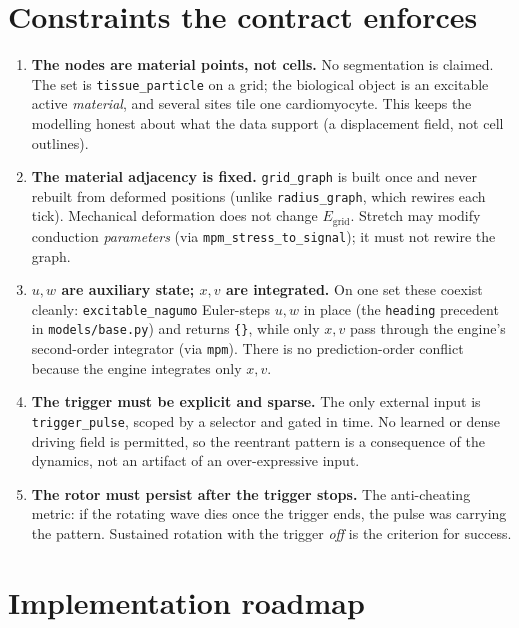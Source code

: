 \documentclass[11pt]{article}
\newcommand{\code}[1]{\texttt{#1}}
\begin{document}
\section{Constraints the contract enforces}

\begin{enumerate}\itemsep4pt
\item \textbf{The nodes are material points, not cells.} No segmentation is claimed.
The set is \code{tissue\_particle} on a grid; the biological object is an excitable
active \emph{material}, and several sites tile one cardiomyocyte. This keeps the
modelling honest about what the data support (a displacement field, not cell
outlines).

\item \textbf{The material adjacency is fixed.} \code{grid\_graph} is built once and
never rebuilt from deformed positions (unlike \code{radius\_graph}, which rewires
each tick). Mechanical deformation does not change $E_{\mathrm{grid}}$. Stretch may
modify conduction \emph{parameters} (via \code{mpm\_stress\_to\_signal}); it must not
rewire the graph.

\item \textbf{$u,w$ are auxiliary state; $x,v$ are integrated.} On one set these
coexist cleanly: \code{excitable\_nagumo} Euler-steps $u,w$ in place (the
\code{heading} precedent in \code{models/base.py}) and returns \code{\{\}}, while
only $x,v$ pass through the engine's second-order integrator (via \code{mpm}). There
is no prediction-order conflict because the engine integrates only $x,v$.

\item \textbf{The trigger must be explicit and sparse.} The only external input is
\code{trigger\_pulse}, scoped by a selector and gated in time. No learned or dense
driving field is permitted, so the reentrant pattern is a consequence of the
dynamics, not an artifact of an over-expressive input.

\item \textbf{The rotor must persist after the trigger stops.} The anti-cheating
metric: if the rotating wave dies once the trigger ends, the pulse was carrying the
pattern. Sustained rotation with the trigger \emph{off} is the criterion for success.
\end{enumerate}

\section{Implementation roadmap}
\end{document}
